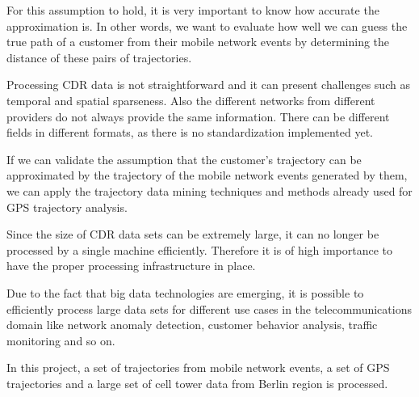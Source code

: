 For this assumption to hold, it is very important to know how accurate the approximation is. In other words, we want to evaluate how well we can guess the true path of a customer from their mobile network events by determining the distance of these pairs of trajectories.

Processing CDR data is not straightforward and it can present challenges such as temporal and spatial sparseness. Also the different networks from different providers do not always provide the same information. There can be different fields in different formats, as there is no standardization implemented yet. 

If we can validate the assumption that the customer's trajectory can be approximated by the trajectory of the mobile network events generated by them, we can apply the trajectory data mining techniques and methods already used for GPS trajectory analysis. 

Since the size of CDR data sets can be extremely large, it can no longer be processed by a single machine efficiently. Therefore it is of high importance to have the proper processing infrastructure in place.  

Due to the fact that big data technologies are emerging, it is possible to efficiently process large data sets for different use cases in the telecommunications domain like network anomaly detection, customer behavior analysis, traffic monitoring and so on.

In this project, a set of trajectories from mobile network events, a set of GPS trajectories and a large set of cell tower data from Berlin region is processed. 


